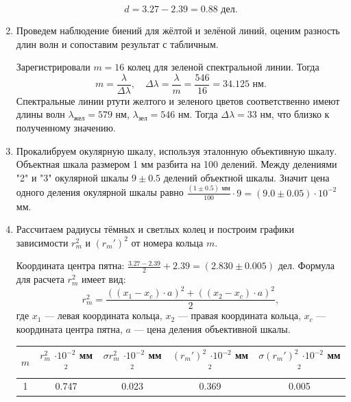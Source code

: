 \documentclass[a4paper, 12pt]{article}
\begin{document}
\begin{enumerate}
		\begin{equation*}
			d=3.27-2.39=0.88 \text{ дел}.
		\end{equation*}
		\item Проведем наблюдение биений для жёлтой и зелёной линий, оценим разность длин волн и сопоставим результат с табличным.\par
			Зарегистрировали $m=16$ колец для зеленой спектральной линии. Тогда
			\begin{equation*}
				m=\frac{\lambda}{\Delta\lambda},\quad \Delta\lambda=\frac{\lambda}{m}=\frac{546}{16}=34.125 \text{ нм}.
			\end{equation*}
			Спектральные линии ртути желтого и зеленого цветов соответственно имеют длины волн $\lambda_\text{жел}=579\text{ нм}$, $\lambda_\text{зел}=546\text{ нм}$. Тогда $\Delta\lambda=33$ нм, что близко к полученному значению.
		\item Прокалибруем окулярную шкалу, используя эталонную объективную шкалу. Объектная шкала размером 1 мм разбита на 100 делений. Между делениями "2" и "3" окулярной шкалы $9\pm0.5$ делений объектной шкалы. Значит цена одного деления окулярной шкалы равно $\frac{(1\pm0.5)\text{ мм}}{100}\cdot 9=(9.0\pm0.05)\cdot10^{-2}$ мм.
		\item Рассчитаем радиусы тёмных и светлых колец и построим графики зависимости $r_m^2$ и $(r_m')^2$ от номера кольца $m$.\par
			Координата центра пятна: $\frac{3.27-2.39}{2} + 2.39=(2.830\pm0.005)$ дел.
			Формула для расчета $r_{m}^2$ имеет вид:
			\begin{equation*}
				r_{m}^2=\frac{\left((x_1-x_c)\cdot a\right)^2+\left((x_2-x_c)\cdot a\right)^2}{2},
			\end{equation*}
			где $x_1$ — левая координата кольца, $x_2$ — правая координата кольца, $x_c$ — координата центра пятна, $a$ — цена деления объективной шкалы.
			\begin{table}[h]
				\centering
				\begin{tabular}{|c|c|c|c|c|}
					\hline
					$m$ & $r_{m}^2$ $\cdot 10^{-2}$ мм$^2$ & $\sigma r_{m}^2$ $\cdot 10^{-2}$ мм$^2$ & $(r_{m}')^2$ $\cdot 10^{-2}$ мм$^2$ & $\sigma (r_{m}')^2$ $\cdot 10^{-2}$ мм$^2$\\
					\hline
					1 & 0.747 & 0.023 & 0.369 & 0.005 \\

\end{tabular}
\end{table}
\end{enumerate}
\end{document}
